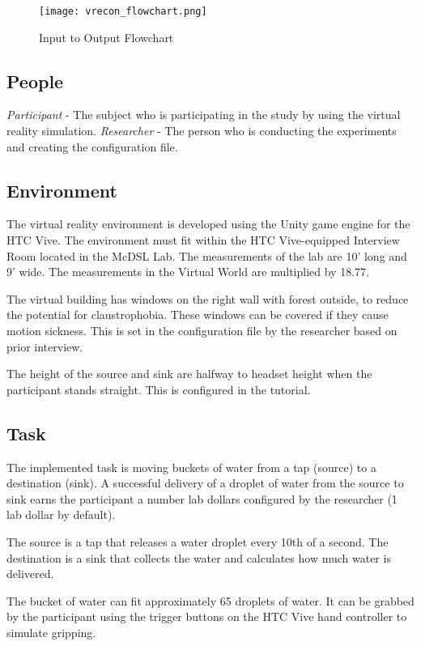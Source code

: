 \documentclass{article}
\begin{document}
\begin{figure}[h!]
\centering
\texttt{[image: vrecon\_flowchart.png]}
\caption{Input to Output Flowchart}
\label{fig:flowchart}
\end{figure}

\subsection{People}
\emph{Participant} - The subject who is participating in the study by using the virtual reality simulation.\newline
\emph{Researcher} - The person who is conducting the experiments and creating the configuration file.

\subsection{Environment}

The virtual reality environment is developed using the Unity game engine for the HTC Vive. The environment must fit within the HTC Vive-equipped Interview Room located in the McDSL Lab. The measurements of the lab are 10’ long and 9’ wide. The measurements in the Virtual World are multiplied by 18.77.

The virtual building has windows on the right wall with forest outside, to reduce the potential for claustrophobia. These windows can be covered if they cause motion sickness. This is set in the configuration file by the researcher based on prior interview.

The height of the source and sink are halfway to headset height when the participant stands straight. This is configured in the tutorial.

\subsection{Task}

The implemented task is moving buckets of water from a tap (source) to a destination (sink). A successful delivery of a droplet of water from the source to sink earns the participant a number lab dollars configured by the researcher (1 lab dollar by default).

The source is a tap that releases a water droplet every 10th of a second. The destination is a sink that collects the water and calculates how much water is delivered.

The bucket of water can fit approximately 65 droplets of water. It can be grabbed by the participant using the trigger buttons on the HTC Vive hand controller to simulate gripping.
\end{document}
